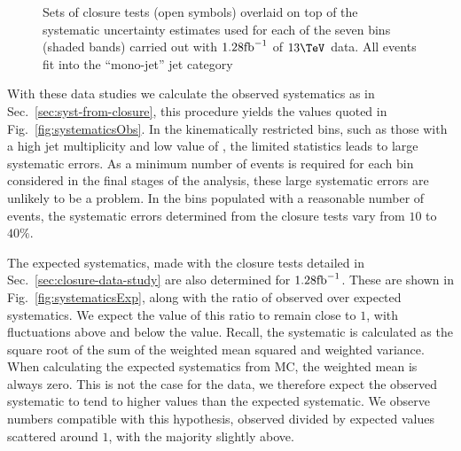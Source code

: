 \begin{figure}[h!]
  \begin{center}
    \caption{Sets of closure tests (open symbols) overlaid on top of
      the systematic uncertainty estimates used for each of the seven
      \scalht bins (shaded bands) carried out with $1.28\text{fb}^{-1}$ of
      $13\tev$ data. All events fit into the ``mono-jet'' jet
      category}
    \label{fig:closureDataMono}
  \end{center} 
\end{figure}

With these data studies we calculate the observed systematics as in
Sec.~\ref{sec:syst-from-closure},
this procedure yields the values quoted in
Fig.~\ref{fig:systematicsObs}. In the kinematically restricted bins, such
as those with a high jet multiplicity and low value of \scalht, the
limited statistics leads to large systematic errors. As a minimum number of
events is required for each bin considered in the final stages of the
analysis, these large systematic errors are unlikely to be a problem.
In the bins populated with a reasonable number of events, the
systematic errors determined from the closure tests vary from $10$ to
$40\%$.

The expected systematics, made with the
closure tests detailed in Sec.~\ref{sec:closure-data-study} are also
determined for $1.28\text{fb}^{-1}$. These are shown in
Fig.~\ref{fig:systematicsExp}, along with the ratio of observed over
expected systematics. We expect the value of this ratio to remain
close to $1$, with
fluctuations above and below the value. Recall, the
systematic is calculated as the square root of the sum of the weighted
mean squared and weighted variance. When calculating the expected
systematics from MC, the weighted mean is always zero. This is not the
case for the data, we therefore expect the observed systematic to
tend to higher values than the expected systematic. We observe numbers
compatible with this hypothesis, observed divided by expected values
scattered around $1$, with the majority slightly above. 

